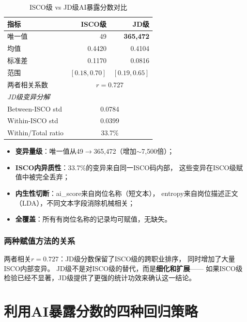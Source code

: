 \documentclass[12pt,a4paper]{ctexart}
\begin{document}
\begin{table}[h!]
\centering
\caption{ISCO级 vs JD级AI暴露分数对比}
\label{tab:score_comparison}
\begin{tabular}{lrr}
\toprule
指标 & ISCO级 & JD级 \\
\midrule
唯一值 & 49 & \textbf{365,472} \\
均值 & 0.4420 & 0.4104 \\
标准差 & 0.1170 & 0.0816 \\
范围 & $[0.18, 0.70]$ & $[0.19, 0.65]$ \\
两者相关系数 & \multicolumn{2}{c}{$r = 0.727$} \\
\midrule
\multicolumn{3}{l}{\textit{JD级变异分解}} \\
\quad Between-ISCO std & \multicolumn{2}{c}{0.0784} \\
\quad Within-ISCO std & \multicolumn{2}{c}{0.0399} \\
\quad Within/Total ratio & \multicolumn{2}{c}{33.7\%} \\
\bottomrule
\end{tabular}
\end{table}

\begin{itemize}
\item \textbf{变异量级}：唯一值从49$\to$365,472（增加$\sim$7,500倍）；
\item \textbf{ISCO内异质性}：33.7\%的变异来自同一ISCO码内部，
      这些变异在ISCO级赋值中被完全丢弃；
\item \textbf{内生性切断}：ai\_score来自岗位名称（短文本），
      entropy来自岗位描述正文（LDA），不同文本字段消除机械相关；
\item \textbf{全覆盖}：所有有岗位名称的记录均可赋值，无缺失。
\end{itemize}

\subsubsection{两种赋值方法的关系}

两者相关$r = 0.727$：JD级分数保留了ISCO级的跨职业排序，
同时增加了大量ISCO内部变异。
JD级不是对ISCO级的替代，而是\textbf{细化和扩展}——
如果ISCO级检验已经不显著，JD级提供了更强的统计功效来确认这一结论。


\section{利用AI暴露分数的四种回归策略}
\label{sec:regression}
\end{document}

